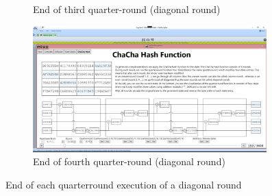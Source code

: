 \begin{figure}
\begin{subfigure}{0.5\textwidth}
  \caption{End of third quarter-round (diagonal round)}
  \label{fig:chachahash.dr.3}
\end{subfigure}%
\begin{subfigure}{0.5\textwidth}
  \centering
  \includegraphics[width=0.99\textwidth]{figures/ct2/chachahash/chachahash-dr4-end.png}
  \caption{End of fourth quarter-round (diagonal round)}
  \label{fig:chachahash.dr.4}
\end{subfigure}
\caption[End of diagonal rounds]{End of each quarterround execution of a diagonal round}
\label{fig:chachahash.dr}
\end{figure}

